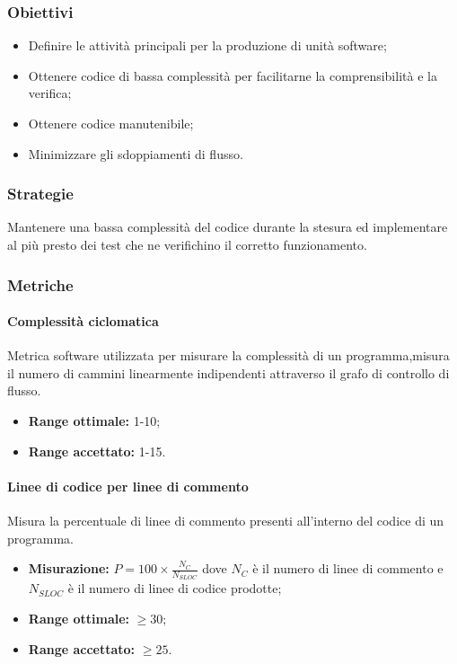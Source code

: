 		\subsubsection{Obiettivi}
		\begin{itemize}
			\item Definire le attività principali per la produzione di unità software;
			\item Ottenere codice di bassa complessità per facilitarne la comprensibilità e la verifica;
			\item Ottenere codice manutenibile;
			\item Minimizzare gli sdoppiamenti di flusso.
		\end{itemize}
		\subsubsection{Strategie}
		Mantenere una bassa complessità del codice durante la stesura ed implementare al più presto dei test che ne verifichino il corretto funzionamento.
		\subsubsection{Metriche}
			\paragraph{Complessità ciclomatica}
			Metrica software utilizzata per misurare la complessità di un programma,misura il numero di cammini linearmente indipendenti attraverso il grafo di controllo di flusso.
			\begin{itemize}
				\item \textbf{Range ottimale:} 1-10;
				\item \textbf{Range accettato:} 1-15.
			\end{itemize}
			\paragraph{Linee di codice per linee di commento}
			Misura la percentuale di linee di commento presenti all'interno del codice di un programma.
			\begin{itemize}
				\item \textbf{Misurazione:} $P=100\times\frac{N_C}{N_{SLOC}}$ dove $N_C$ è il numero di linee di commento e $N_{SLOC}$ è il numero di linee di codice prodotte;
				\item \textbf{Range ottimale:} $\geq30$;
				\item \textbf{Range accettato:} $\geq25$.
			\end{itemize}
